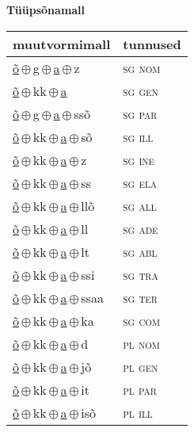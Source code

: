 

\vspace{3.5em}
\noindent \begin{minipage}{\textwidth}
\noindent \textbf{Tüüpsõnamall \,}\\

\begin{sideways}
\begin{tabular}{l l}
muutvormimall & tunnused \\
\hline
\underline{õ}\,$\oplus$\,g\,$\oplus$\,\underline{a}\,$\oplus$\,z & \textsc{ sg nom } \\
\underline{õ}\,$\oplus$\,kk\,$\oplus$\,\underline{a} & \textsc{ sg gen } \\
\underline{õ}\,$\oplus$\,g\,$\oplus$\,\underline{a}\,$\oplus$\,ssõ & \textsc{ sg par } \\
\underline{õ}\,$\oplus$\,kk\,$\oplus$\,\underline{a}\,$\oplus$\,sõ & \textsc{ sg ill } \\
\underline{õ}\,$\oplus$\,kk\,$\oplus$\,\underline{a}\,$\oplus$\,z & \textsc{ sg ine } \\
\underline{õ}\,$\oplus$\,kk\,$\oplus$\,\underline{a}\,$\oplus$\,ss & \textsc{ sg ela } \\
\underline{õ}\,$\oplus$\,kk\,$\oplus$\,\underline{a}\,$\oplus$\,llõ & \textsc{ sg all } \\
\underline{õ}\,$\oplus$\,kk\,$\oplus$\,\underline{a}\,$\oplus$\,ll & \textsc{ sg ade } \\
\underline{õ}\,$\oplus$\,kk\,$\oplus$\,\underline{a}\,$\oplus$\,lt & \textsc{ sg abl } \\
\underline{õ}\,$\oplus$\,kk\,$\oplus$\,\underline{a}\,$\oplus$\,ssi & \textsc{ sg tra } \\
\underline{õ}\,$\oplus$\,kk\,$\oplus$\,\underline{a}\,$\oplus$\,ssaa & \textsc{ sg ter } \\
\underline{õ}\,$\oplus$\,kk\,$\oplus$\,\underline{a}\,$\oplus$\,ka & \textsc{ sg com } \\
\underline{õ}\,$\oplus$\,kk\,$\oplus$\,\underline{a}\,$\oplus$\,d & \textsc{ pl nom } \\
\underline{õ}\,$\oplus$\,kk\,$\oplus$\,\underline{a}\,$\oplus$\,jõ & \textsc{ pl gen } \\
\underline{õ}\,$\oplus$\,kk\,$\oplus$\,\underline{a}\,$\oplus$\,it & \textsc{ pl par } \\
\underline{õ}\,$\oplus$\,kk\,$\oplus$\,\underline{a}\,$\oplus$\,isõ & \textsc{ pl ill } \\

\end{tabular}
\end{sideways}
\end{minipage}
